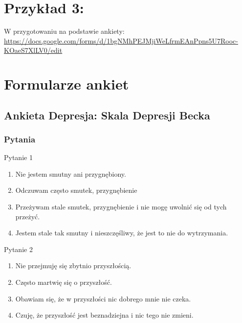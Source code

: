 \documentclass[
  openany]{book}
\providecommand{\tightlist}{%
  \setlength{\itemsep}{0pt}\setlength{\parskip}{0pt}}
\begin{document}
\hypertarget{przykux142ad-3}{%
\section{Przykład 3:}\label{przykux142ad-3}}

{W przygotowaniu na podstawie ankiety:
\url{https://docs.google.com/forms/d/1bgNMhPEJMjiWeLfrmEAnPpns5U7Rooc-KOaeS7XlLV0/edit}
}

\hypertarget{formularze-ankiet}{%
\section{Formularze ankiet}\label{formularze-ankiet}}

\hypertarget{ankieta-depresja-skala-depresji-becka}{%
\subsection{Ankieta Depresja: Skala Depresji Becka}\label{ankieta-depresja-skala-depresji-becka}}

\hypertarget{pytania}{%
\subsubsection{Pytania}\label{pytania}}

Pytanie 1

\begin{enumerate}
\def\labelenumi{\arabic{enumi}.}
\setcounter{enumi}{-1}
\tightlist
\item
  Nie jestem smutny ani przygnębiony.
\item
  Odczuwam często smutek, przygnębienie
\item
  Przeżywam stale smutek, przygnębienie i nie mogę uwolnić się od tych przeżyć.
\item
  Jestem stale tak smutny i nieszczęśliwy, że jest to nie do wytrzymania.
\end{enumerate}

Pytanie 2

\begin{enumerate}
\def\labelenumi{\arabic{enumi}.}
\setcounter{enumi}{-1}
\tightlist
\item
  Nie przejmuję się zbytnio przyszłością.
\item
  Często martwię się o przyszłość.
\item
  Obawiam się, że w przyszłości nic dobrego mnie nie czeka.
\item
  Czuję, że przyszłość jest beznadziejna i nic tego nie zmieni.
\end{enumerate}
\end{document}
